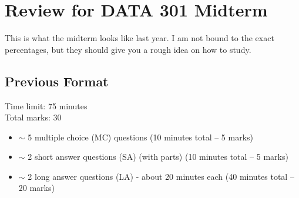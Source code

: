 \documentclass{article}%
\begin{document}
\section{Review for DATA 301 Midterm}

This is what the midterm looks like last year.  I am not bound to the exact percentages, but they should give you a rough idea on how to study.

\subsection{Previous Format}

Time limit: 75 minutes\\
Total marks: 30\\

\begin{itemize}
\item $\sim$ 5 multiple choice (MC) questions   (10 minutes total -- 5 marks)
\item $\sim$  2 short answer questions (SA) (with parts) (10 minutes total -- 5 marks)
\item $\sim$  2 long answer questions (LA) - about 20 minutes each (40 minutes total -- 20 marks)
\end{itemize}

%

%
%
\end{document}
